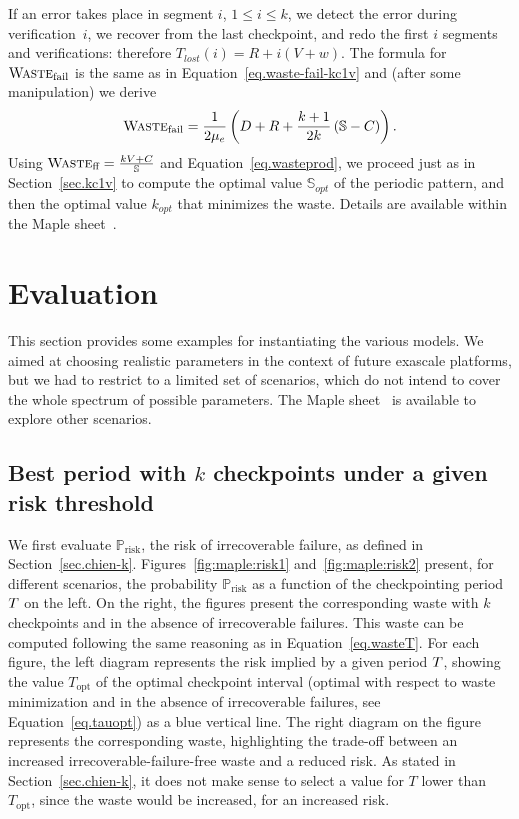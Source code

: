 \documentclass[10pt,table]{article}
\newcommand{\ema}[1]{\ensuremath{#1}\xspace}
\newcommand{\Xlost}{\ema{T_{lost}}}
\newcommand{\www}{\ema{w}}
\newcommand{\mue}{\ema{\mu_{e}}}
\newcommand{\ccc}{\ema{C}}
\newcommand{\rrr}{\ema{R}}
\newcommand{\ddd}{\ema{D}}
\newcommand{\vvv}{\ema{V}}
\newcommand{\sss}{\ema{\mathbb{S}}}
\newcommand{\Wasteff}{\ema{\textsc{Waste}_{\text{ff}}}}
\newcommand{\Wastefail}{\ema{\textsc{Waste}_{\text{fail}}}}
\newcommand{\Pfd}{\ema{\mathbb{P}_{\text{risk}}}}
\newcommand{\Topt}{\ema{T_{\text{opt}}}}
\begin{document}
If an error takes place in segment $i$, $1 \leq i \leq k$, we detect the error during verification~$i$,
we recover from the last checkpoint, and redo the first $i$ segments and verifications: therefore
$\Xlost(i) = \rrr + i(\vvv + \www )$.
The formula for \Wastefail is  the same as in Equation~\eqref{eq.waste-fail-kc1v}
and (after some manipulation) we derive
\begin{equation}
\Wastefail = \frac{1}{2 \mue}\left(\ddd+\rrr+\frac{k+1}{2k}\left(\sss-\ccc\right)\right) .
\label{eq.wastefail-kv1c}
\end{equation}
Using $\Wasteff = \frac{k\vvv + \ccc}{\sss}$ and Equation~\eqref{eq.wasteprod}, we proceed just as
in Section~\ref{sec.kc1v} to compute the optimal value $\sss_{opt}$ of the periodic pattern, and then
the optimal value $k_{opt}$ that minimizes the waste. Details are available within the 
Maple sheet~\cite{webrefmaple}.

\section{Evaluation}
\label{sec.evaluation}

This section provides some examples for instantiating the various
models. We aimed at choosing realistic parameters in the context of
future exascale platforms, but we had to restrict to a limited set of
scenarios, which do not intend to cover the whole spectrum of possible
parameters. The Maple sheet~\cite{webrefmaple} is available to explore
other scenarios.

\subsection{Best period with $k$ checkpoints under a given risk threshold}
\label{sec.evaluation.k}

We first evaluate $\Pfd$, the risk of irrecoverable failure, as defined in Section~\ref{sec.chien-k}.
Figures~\ref{fig:maple:risk1} and~\ref{fig:maple:risk2}
present, for different scenarios, the probability $\Pfd$ as a function
of the checkpointing period $T$ on the left. On the right, the
figures present the corresponding
waste with $k$ checkpoints and 
in the absence of irrecoverable  failures. This waste can be computed  
following the same reasoning as in Equation~\eqref{eq.wasteT}.
For each figure, the left
diagram represents the risk implied by a given period $T$, showing
the value $\Topt$ of the optimal checkpoint interval (optimal
with respect to waste minimization and in the absence of irrecoverable  failures, 
see Equation~\eqref{eq.tauopt}) as a blue vertical line. The right
diagram on the figure represents the corresponding waste, highlighting
the trade-off between an increased irrecoverable-failure-free waste and a reduced risk. As stated
in Section~\ref{sec.chien-k}, it does not make sense to select a
value for $T$ lower than $\Topt$, since the waste would be
increased, for an increased risk.
\end{document}
